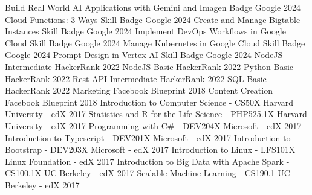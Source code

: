 
\begin{cvhonors}
    \cvhonor
        {Build Real World AI Applications with Gemini and Imagen Badge}
        {Google}
        {}
        {2024}
    \cvhonor
        {Cloud Functions: 3 Ways Skill Badge}
        {Google}
        {}
        {2024}
    \cvhonor
        {Create and Manage Bigtable Instances Skill Badge}
        {Google}
        {}
        {2024}
    \cvhonor
        {Implement DevOps Workflows in Google Cloud Skill Badge}
        {Google}
        {}
        {2024}
    \cvhonor
        {Manage Kubernetes in Google Cloud Skill Badge}
        {Google}
        {}
        {2024}
    \cvhonor
        {Prompt Design in Vertex AI Skill Badge}
        {Google}
        {}
        {2024}
    \cvhonor
        {NodeJS Intermediate}
        {HackerRank}
        {}
        {2022}
    \cvhonor
        {NodeJS Basic}
        {HackerRank}
        {}
        {2022}
    \cvhonor
        {Python Basic}
        {HackerRank}
        {}
        {2022}
    \cvhonor
        {Rest API Intermediate}
        {HackerRank}
        {}
        {2022}
    \cvhonor
        {SQL Basic}
        {HackerRank}
        {}
        {2022}
    \cvhonor
        {Marketing}
        {Facebook Blueprint}
        {}
        {2018}
    \cvhonor
        {Content Creation}
        {Facebook Blueprint}
        {}
        {2018}
    \cvhonor
        {Introduction to Computer Science - CS50X}
        {Harvard University - edX}
        {}
        {2017}
    \cvhonor
        {Statistics and R for the Life Science - PHP525.1X}
        {Harvard University - edX}
        {}
        {2017}
    \cvhonor
        {Programming with C\# - DEV204X}
        {Microsoft - edX}
        {}
        {2017}
    \cvhonor
        {Introduction to Typescript - DEV201X}
        {Microsoft - edX}
        {}
        {2017}
    \cvhonor
        {Introduction to Bootstrap - DEV203X}
        {Microsoft - edX}
        {}
        {2017}
    \cvhonor
        {Introduction to Linux - LFS101X}
        {Linux Foundation - edX}
        {}
        {2017}
    \cvhonor
        {Introduction to Big Data with Apache Spark - CS100.1X}
        {UC Berkeley - edX}
        {}
        {2017}
    \cvhonor
        {Scalable Machine Learning - CS190.1}
        {UC Berkeley - edX}
        {}
        {2017}
\end{cvhonors}